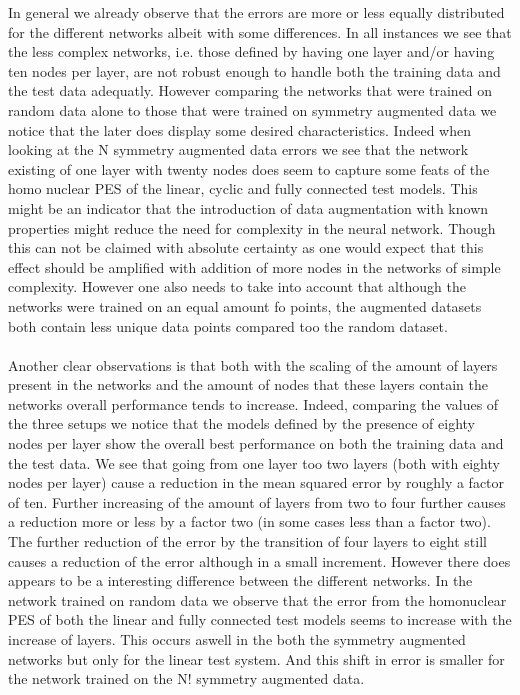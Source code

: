 \documentclass[]{article}
\begin{document}
In general we already observe that the errors are more or less equally distributed for the different networks albeit with some differences. In all instances we see that the less complex networks, i.e. those defined by having one layer and/or having ten nodes per layer, are not robust enough to handle both the training data and the test data adequatly. However comparing the networks that were trained on random data alone to those that were trained on symmetry augmented data we notice that the later does display some desired characteristics. Indeed when looking at the N symmetry augmented data errors we see that the network existing of one layer with twenty nodes does seem to capture some feats of the homo nuclear PES of the linear, cyclic and fully connected test models. This might be an indicator that the introduction of data augmentation with known properties might reduce the need for complexity in the neural network. Though this can not be claimed with absolute certainty as one would expect that this effect should be amplified with addition of more nodes in the networks of simple complexity. However one also needs to take into account that although the networks were trained on an equal amount fo points, the augmented datasets both contain less unique data points compared too the random dataset.
\\
\\
Another clear observations is that both with the scaling of the amount of layers present in the networks and the amount of nodes that these layers contain the networks overall performance tends to increase. Indeed, comparing the values of the three setups we notice that the models defined by the presence of eighty nodes per layer show the overall best performance on both the training data and the test data. We see that going from one layer too two layers (both with eighty nodes per layer) cause a reduction in the mean squared error by roughly a factor of ten. Further increasing of the amount of layers from two to four further causes a reduction more or less by a factor two (in some cases less than a factor two). The further reduction of the error by the transition of four layers to eight still causes a reduction of the error although in a small increment. However there does appears to be a interesting difference between the different networks. In the network trained on random data we observe that the error from the homonuclear PES of both the linear and fully connected test models seems to increase with the increase of layers. This occurs aswell in the both the  symmetry augmented networks but only for the linear test system. And this shift in error is smaller for the network trained on the N! symmetry augmented data.  
\end{document}
